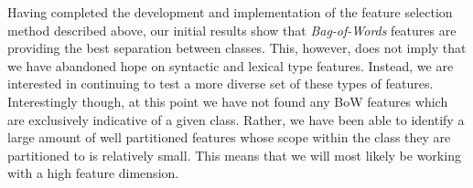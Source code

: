 Having completed the development and implementation of the feature selection method described above, our initial results show that \emph{Bag-of-Words} features are providing the best separation between classes. This, however, does not imply that we have abandoned hope on syntactic and lexical type features. Instead, we are interested in continuing to test a more diverse set of these types of features. Interestingly though, at this point we have not found any BoW features which are exclusively indicative of a given class. Rather, we have been able to identify a large amount of well partitioned features whose scope within the class they are partitioned to is relatively small. This means that we will most likely be working with a high feature dimension.